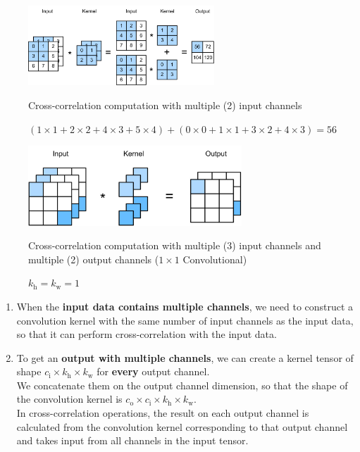 \begin{table}[H]
    \begin{minipage}[b]{0.65\linewidth}
        \begin{figure}[H]
            \centering
            \includegraphics[width=\linewidth, height=3cm, keepaspectratio]{Pictures/convolutional-neural-network/conv-multi-in.jpg}
            \caption*{Cross-correlation computation with multiple (2) input channels}
            \caption*{$(1\times1+2\times2+4\times3+5\times4)+(0\times0+1\times1+3\times2+4\times3)=56$}
        \end{figure}
    \end{minipage}
    \hfill
    \begin{minipage}[b]{0.35\linewidth}
        \begin{figure}[H]
            \centering
            \includegraphics[width=\linewidth, height=3cm, keepaspectratio]{Pictures/convolutional-neural-network/conv-1x1.jpg}
            \caption*{Cross-correlation computation with multiple (3) input channels and multiple (2) output channels ($1\times 1$ Convolutional)}
            \caption*{$k_\textrm{h} = k_\textrm{w} = 1$}
        \end{figure}
    \end{minipage}
\end{table}

\begin{enumerate}
    \item When the \textbf{input data contains multiple channels}, we need to construct a convolution kernel with the same number of input channels as the input data, so that it can perform cross-correlation with the input data.

    \item To get an \textbf{output with multiple channels}, we can create a kernel tensor of shape $c_\textrm{i}\times k_\textrm{h}\times k_\textrm{w}$ for \textbf{every} output channel.\\
    We concatenate them on the output channel dimension, so that the shape of the convolution kernel is $c_\textrm{o}\times c_\textrm{i}\times k_\textrm{h}\times k_\textrm{w}$. \\
    In cross-correlation operations, the result on each output channel is calculated from the convolution kernel corresponding to that output channel and takes input from all channels in the input tensor.
\end{enumerate}



